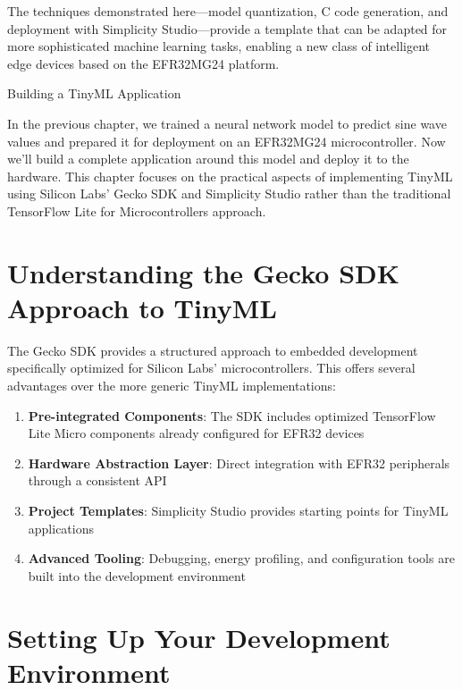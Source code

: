 \documentclass[
  9pt,
  letterpaper,
  abstract,
  titlepage]{scrbook}
\makeatletter
\providecommand{\tightlist}{%
  \setlength{\itemsep}{0pt}\setlength{\parskip}{0pt}}\usepackage{longtable,booktabs,array}
\def\tightlist{}
\let\tightlist\relax
\renewcommand\chapter{\clearpage\global\@topnum\z@
\@afterindentfalse \secdef\@chapter\@schapter}
\newif\if@firstnumbered%
\newif\if@firstunnumbered%
\newcounter{lastRomanPage}
\let\old@chapter\chapter%
\renewcommand{\chapter}{%
  \@ifstar{\unnumbered@chapter}{\numbered@chapter}%
}
\newcommand{\numbered@chapter}[1]{%
  \if@firstnumbered%
    \cleardoublepage%
    \setcounter{lastRomanPage}{\value{page}}%
    \pagenumbering{arabic}%
    \@firstnumberedfalse%
  \else
    \setcounter{page}{\value{page}}%
  \fi
  \old@chapter{#1}%
}
\newcommand{\unnumbered@chapter}[1]{%
  \if@firstunnumbered%
    \clearpage
    \setcounter{lastRomanPage}{\value{page}}%
    \pagenumbering{roman}%
    \@firstunnumberedfalse%
  \fi
  \old@chapter*{#1}%
}
\makeatother
\begin{document}
The techniques demonstrated here---model quantization, C code
generation, and deployment with Simplicity Studio---provide a template
that can be adapted for more sophisticated machine learning tasks,
enabling a new class of intelligent edge devices based on the EFR32MG24
platform.

\chapter{Building a TinyML
Application}\label{building-a-tinyml-application}

In the previous chapter, we trained a neural network model to predict
sine wave values and prepared it for deployment on an EFR32MG24
microcontroller. Now we'll build a complete application around this
model and deploy it to the hardware. This chapter focuses on the
practical aspects of implementing TinyML using Silicon Labs' Gecko SDK
and Simplicity Studio rather than the traditional TensorFlow Lite for
Microcontrollers approach.

\section{Understanding the Gecko SDK Approach to
TinyML}\label{understanding-the-gecko-sdk-approach-to-tinyml}

The Gecko SDK provides a structured approach to embedded development
specifically optimized for Silicon Labs' microcontrollers. This offers
several advantages over the more generic TinyML implementations:

\begin{enumerate}
\def\labelenumi{\arabic{enumi}.}
\tightlist
\item
  \textbf{Pre-integrated Components}: The SDK includes optimized
  TensorFlow Lite Micro components already configured for EFR32 devices
\item
  \textbf{Hardware Abstraction Layer}: Direct integration with EFR32
  peripherals through a consistent API
\item
  \textbf{Project Templates}: Simplicity Studio provides starting points
  for TinyML applications
\item
  \textbf{Advanced Tooling}: Debugging, energy profiling, and
  configuration tools are built into the development environment
\end{enumerate}

\section{Setting Up Your Development
Environment}\label{setting-up-your-development-environment}
\end{document}
